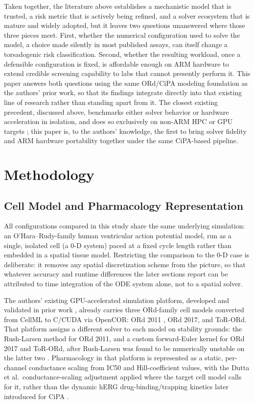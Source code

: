 \documentclass[journal]{IEEEtran}
\begin{document}
Taken together, the literature above establishes a mechanistic model that is trusted, a risk metric that is actively being refined, and a solver ecosystem that is mature and widely adopted, but it leaves two questions unanswered where those three pieces meet. First, whether the numerical configuration used to solve the model, a choice made silently in most published assays, can itself change a torsadogenic risk classification. Second, whether the resulting workload, once a defensible configuration is fixed, is affordable enough on ARM hardware to extend credible screening capability to labs that cannot presently perform it. This paper answers both questions using the same ORd/CiPA modeling foundation as the authors' prior work, so that its findings integrate directly into that existing line of research rather than standing apart from it. The closest existing precedent, discussed above, benchmarks either solver behavior or hardware acceleration in isolation, and does so exclusively on non-ARM HPC or GPU targets \cite{sachetto2025,marinsdelima2025}; this paper is, to the authors' knowledge, the first to bring solver fidelity and ARM hardware portability together under the same CiPA-based pipeline.

\section{Methodology}

\subsection{Cell Model and Pharmacology Representation}

All configurations compared in this study share the same underlying simulation: an O'Hara--Rudy-family human ventricular action potential model, run as a single, isolated cell (a 0-D system) paced at a fixed cycle length rather than embedded in a spatial tissue model. Restricting the comparison to the 0-D case is deliberate: it removes any spatial discretization scheme from the picture, so that whatever accuracy and runtime differences the later sections report can be attributed to time integration of the ODE system alone, not to a spatial solver.

The authors' existing GPU-accelerated simulation platform, developed and validated in prior work \cite{pramawijaya2024thesis}, already carries three ORd-family cell models converted from CellML to C/CUDA via OpenCOR: ORd 2011 \cite{ohara2011}, ORd 2017, and ToR-ORd. That platform assigns a different solver to each model on stability grounds: the Rush-Larsen method for ORd 2011, and a custom forward-Euler kernel for ORd 2017 and ToR-ORd, after Rush-Larsen was found to be numerically unstable on the latter two \cite{pramawijaya2024thesis}. Pharmacology in that platform is represented as a static, per-channel conductance scaling from IC50 and Hill-coefficient values, with the Dutta et al.\ conductance-scaling adjustment applied where the target cell model calls for it, rather than the dynamic hERG drug-binding/trapping kinetics later introduced for CiPA \cite{li2017}.
\end{document}
